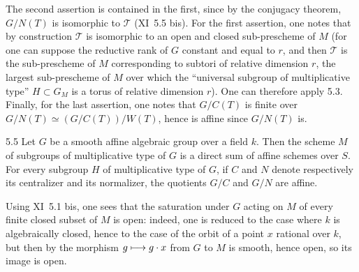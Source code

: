 The second assertion is contained in the first, since by the conjugacy theorem, $G/N(T)$ is isomorphic to $\mathscr T$ (XI~5.5 bis). For the first assertion, one notes that by construction $\mathscr T$ is isomorphic to an open and closed sub-prescheme of $M$ (for one can suppose the reductive rank of $G$ constant and equal to $r$, and then $\mathscr T$ is the sub-prescheme of $M$ corresponding to subtori of relative dimension $r$, \ie the largest sub-prescheme of $M$ over which the ``universal subgroup of multiplicative type'' $H\subset G_M$ is a torus of relative dimension $r$). One can therefore apply 5.3. Finally, for the last assertion, one notes that $G/C(T)$ is finite over $G/N(T)\simeq(G/C(T))/W(T)$, hence is affine since $G/N(T)$ is.
\begin{corollary}{5.5}\label{XII.5.5}
Let $G$ be a smooth affine algebraic group over a field $k$. Then the scheme $M$ of subgroups of multiplicative type of $G$ is a direct sum of affine schemes over $S$. For every subgroup $H$ of multiplicative type of $G$, if $C$ and $N$ denote respectively its centralizer and its normalizer, the quotients $G/C$ and $G/N$ are affine.
\end{corollary}
Using XI~5.1 bis, one sees that the saturation under $G$ acting on $M$ of every finite closed subset of $M$ is open: indeed, one is reduced to the case where $k$ is algebraically closed, hence to the case of the orbit of a point $x$ rational over $k$, but then by \loccit the morphism $g\longmapsto g\cdot x$ from $G$ to $M$ is smooth, hence open, so its image is open.

